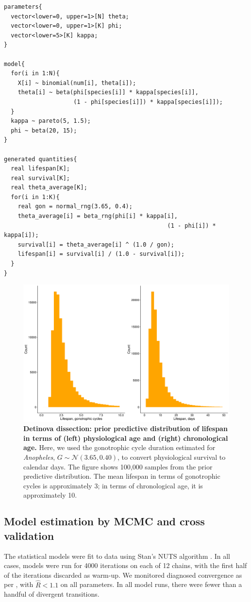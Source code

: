 \documentclass[12pt]{article}
\begin{document}
{\begin{verbatim}
parameters{
  vector<lower=0, upper=1>[N] theta;
  vector<lower=0, upper=1>[K] phi;
  vector<lower=5>[K] kappa;
}

model{
  for(i in 1:N){
    X[i] ~ binomial(num[i], theta[i]);
    theta[i] ~ beta(phi[species[i]] * kappa[species[i]],
                    (1 - phi[species[i]]) * kappa[species[i]]);
  }
  kappa ~ pareto(5, 1.5);
  phi ~ beta(20, 15);
}

generated quantities{
  real lifespan[K];
  real survival[K];
  real theta_average[K];
  for(i in 1:K){
    real gon = normal_rng(3.65, 0.4);
    theta_average[i] = beta_rng(phi[i] * kappa[i],
										       (1 - phi[i]) * kappa[i]);
    survival[i] = theta_average[i] ^ (1.0 / gon);
    lifespan[i] = survival[i] / (1.0 - survival[i]); 
  }
}
\end{verbatim}


\begin{figure}[ht]
	\centerline{\includegraphics[width=1\textwidth]{./Figure_files/detinova_prior_predictive.pdf}}
	\caption{\textbf{Detinova dissection: prior predictive distribution of lifespan in terms of (left) physiological age and (right) chronological age.} Here, we used the gonotrophic cycle duration estimated for \textit{Anopheles}, $G\sim \mathcal{N}(3.65, 0.40)$, to convert physiological survival to calendar days. The figure shows 100,000 samples from the prior predictive distribution. The mean lifespan in terms of gonotrophic cycles is approximately 3; in terms of chronological age, it is approximately 10.}\label{fig:detinova_priors}
\end{figure}

\subsection{Model estimation by MCMC and cross validation}
The statistical models were fit to data using Stan's NUTS algorithm \cite{carpenter2016stan}. In all cases, models were run for 4000 iterations on each of 12 chains, with the first half of the iterations discarded as warm-up. We monitored diagnosed convergence as per \cite{gelman1992inference}, with $\hat{R}<1.1$ on all parameters. In all model runs, there were fewer than a handful of divergent transitions. 

}
\end{document}
